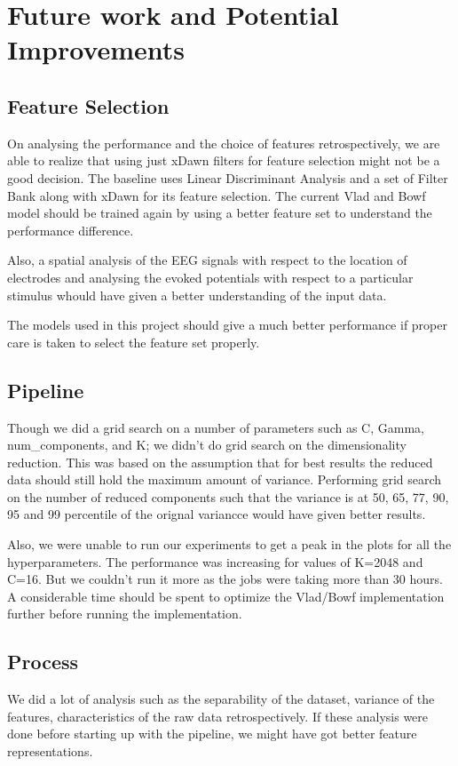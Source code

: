 \documentclass[final,leqno,onefignum,onetabnum]{siamltexmm}
\begin{document}
\section{Future work and Potential Improvements}
\subsection{Feature Selection}
  On analysing the performance and the choice of features retrospectively, we are able to realize that using just xDawn filters for feature selection might not be a good decision.  
The baseline uses Linear Discriminant Analysis and a set of Filter Bank along with xDawn for its feature selection.
The current Vlad and Bowf model should be trained again by using a better feature set to understand the performance difference.

Also, a spatial analysis of the EEG signals with respect to the location of electrodes and analysing the evoked potentials with respect to a particular stimulus whould have given a better understanding of the input data.

The models used in this project should give a much better performance if proper care is taken to select the feature set properly.

\subsection{Pipeline}
Though we did a grid search on a number of parameters such as C, Gamma, num\_components, and K\@; we didn't do grid search on the dimensionality reduction.  
This was based on the assumption that for best results the reduced data should still hold the maximum amount of variance.
Performing grid search on the number of reduced components such that the variance is at 50, 65, 77, 90, 95 and 99 percentile of the orignal variancce would have given better results.

Also, we were unable to run our experiments to get a peak in the plots for all the hyperparameters.  
The performance was increasing for values of K=2048 and C=16.  
But we couldn't run it more as the jobs were taking more than 30 hours.  A considerable time should be spent to optimize the Vlad/Bowf implementation further before running the implementation.


\subsection{Process}
We did a lot of analysis such as the separability of the dataset, variance of the features, characteristics of the raw data retrospectively.  If these analysis were done before starting up with the pipeline, we might have got better feature representations.
\end{document}
